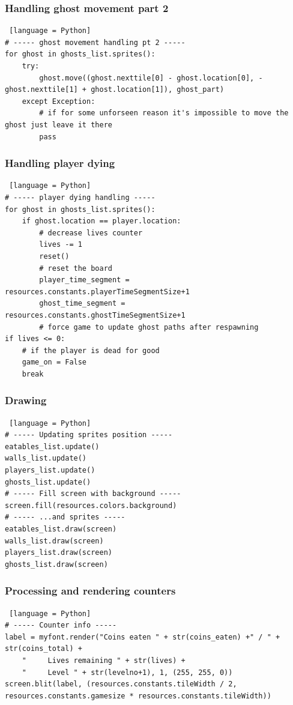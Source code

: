 \documentclass[11pt,a4paper]{report}
\begin{document}
				\subsubsection{Handling ghost movement part 2}
					\begin{lstlisting} [language = Python]
# ----- ghost movement handling pt 2 -----
for ghost in ghosts_list.sprites():
	try:
		ghost.move((ghost.nexttile[0] - ghost.location[0], -ghost.nexttile[1] + ghost.location[1]), ghost_part)
	except Exception:
		# if for some unforseen reason it's impossible to move the ghost just leave it there
		pass
					\end{lstlisting}
				\subsubsection{Handling player dying}
					\begin{lstlisting} [language = Python]
# ----- player dying handling -----
for ghost in ghosts_list.sprites():
	if ghost.location == player.location:
		# decrease lives counter
		lives -= 1
		reset()
		# reset the board
		player_time_segment = resources.constants.playerTimeSegmentSize+1
		ghost_time_segment = resources.constants.ghostTimeSegmentSize+1
		# force game to update ghost paths after respawning
if lives <= 0:
	# if the player is dead for good
	game_on = False
	break
					\end{lstlisting}
				\subsubsection{Drawing}
					\begin{lstlisting} [language = Python]
# ----- Updating sprites position -----
eatables_list.update()
walls_list.update()
players_list.update()
ghosts_list.update()
# ----- Fill screen with background -----
screen.fill(resources.colors.background)
# ----- ...and sprites -----
eatables_list.draw(screen)
walls_list.draw(screen)
players_list.draw(screen)
ghosts_list.draw(screen)
					\end{lstlisting}
				\subsubsection{Processing and rendering counters}
					\begin{lstlisting} [language = Python]	
# ----- Counter info -----
label = myfont.render("Coins eaten " + str(coins_eaten) +" / " + str(coins_total) +
	"     Lives remaining " + str(lives) +
	"     Level " + str(levelno+1), 1, (255, 255, 0))
screen.blit(label, (resources.constants.tileWidth / 2, resources.constants.gamesize * resources.constants.tileWidth))
					\end{lstlisting}
\end{document}
